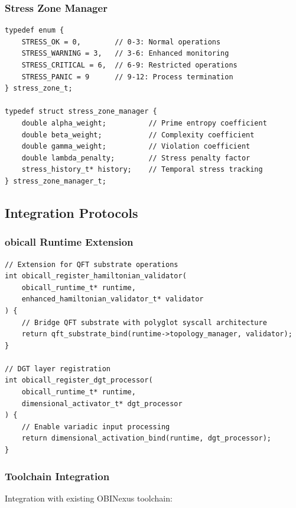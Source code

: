 \documentclass[12pt]{article}
\begin{document}
\subsubsection{Stress Zone Manager}

\begin{lstlisting}
typedef enum {
    STRESS_OK = 0,        // 0-3: Normal operations
    STRESS_WARNING = 3,   // 3-6: Enhanced monitoring  
    STRESS_CRITICAL = 6,  // 6-9: Restricted operations
    STRESS_PANIC = 9      // 9-12: Process termination
} stress_zone_t;

typedef struct stress_zone_manager {
    double alpha_weight;          // Prime entropy coefficient
    double beta_weight;           // Complexity coefficient  
    double gamma_weight;          // Violation coefficient
    double lambda_penalty;        // Stress penalty factor
    stress_history_t* history;    // Temporal stress tracking
} stress_zone_manager_t;
\end{lstlisting}

\subsection{Integration Protocols}

\subsubsection{obicall Runtime Extension}

\begin{lstlisting}
// Extension for QFT substrate operations
int obicall_register_hamiltonian_validator(
    obicall_runtime_t* runtime,
    enhanced_hamiltonian_validator_t* validator
) {
    // Bridge QFT substrate with polyglot syscall architecture
    return qft_substrate_bind(runtime->topology_manager, validator);
}

// DGT layer registration
int obicall_register_dgt_processor(
    obicall_runtime_t* runtime,
    dimensional_activator_t* dgt_processor
) {
    // Enable variadic input processing
    return dimensional_activation_bind(runtime, dgt_processor);
}
\end{lstlisting}

\subsubsection{Toolchain Integration}

Integration with existing OBINexus toolchain:
\end{document}
